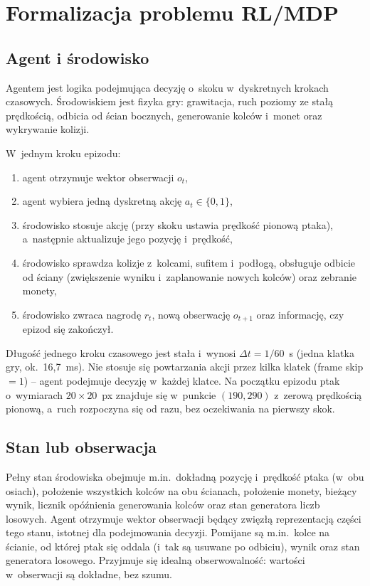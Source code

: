 \documentclass[12pt]{article}
\begin{document}
\section{Formalizacja problemu RL/MDP}

\subsection{Agent i środowisko}
 
Agentem jest logika podejmująca decyzję o~skoku w~dyskretnych krokach
czasowych. Środowiskiem jest fizyka gry: grawitacja, ruch poziomy ze stałą
prędkością, odbicia od ścian bocznych, generowanie kolców i~monet oraz
wykrywanie kolizji.

W~jednym kroku epizodu:
\begin{enumerate}
    \item agent otrzymuje wektor obserwacji $o_t$,
    \item agent wybiera jedną dyskretną akcję $a_t \in \{0, 1\}$,
    \item środowisko stosuje akcję (przy skoku ustawia prędkość pionową
    ptaka), a~następnie aktualizuje jego pozycję i~prędkość,
    \item środowisko sprawdza kolizje z~kolcami, sufitem i~podłogą,
    obsługuje odbicie od ściany (zwiększenie wyniku i~zaplanowanie nowych
    kolców) oraz zebranie monety,
    \item środowisko zwraca nagrodę $r_t$, nową obserwację $o_{t+1}$
    oraz informację, czy epizod się zakończył.
\end{enumerate}

Długość jednego kroku czasowego jest stała i~wynosi $\Delta t = 1/60$~s
(jedna klatka gry, ok.\ 16{,}7~ms). Nie stosuje się powtarzania akcji
przez kilka klatek (frame skip $= 1$) -- agent podejmuje decyzję
w~każdej klatce. Na początku epizodu ptak o~wymiarach $20 \times 20$~px
znajduje się w~punkcie $(190, 290)$ z~zerową prędkością pionową,
a~ruch rozpoczyna się od razu, bez oczekiwania na pierwszy skok.

\subsection{Stan lub obserwacja}

Pełny stan środowiska obejmuje m.in.\ dokładną pozycję i~prędkość ptaka
(w~obu osiach), położenie wszystkich kolców na obu ścianach, położenie
monety, bieżący wynik, licznik opóźnienia generowania kolców oraz stan
generatora liczb losowych. Agent otrzymuje wektor obserwacji będący
zwięzłą reprezentacją części tego stanu, istotnej dla podejmowania decyzji.
Pomijane są m.in.\ kolce na ścianie, od której ptak się oddala (i~tak są
usuwane po odbiciu), wynik oraz stan generatora losowego. Przyjmuje się
idealną obserwowalność: wartości w~obserwacji są dokładne, bez szumu.
\end{document}
